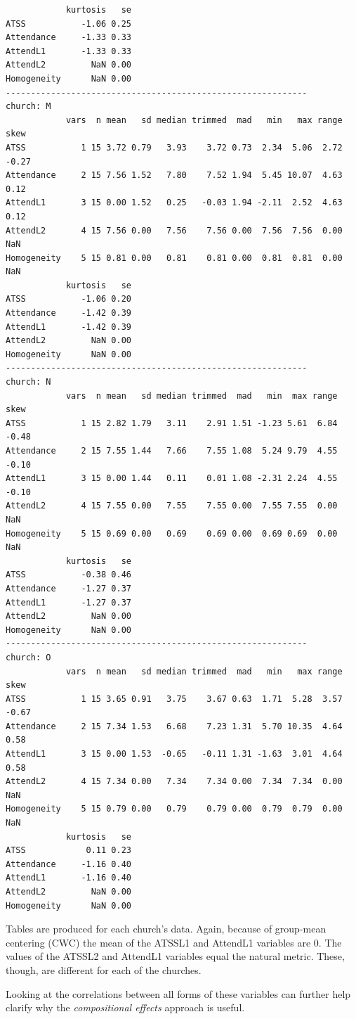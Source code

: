 \documentclass[
  english,
]{book}
\begin{document}
\begin{verbatim}
            kurtosis   se
ATSS           -1.06 0.25
Attendance     -1.33 0.33
AttendL1       -1.33 0.33
AttendL2         NaN 0.00
Homogeneity      NaN 0.00
------------------------------------------------------------ 
church: M
            vars  n mean   sd median trimmed  mad   min   max range  skew
ATSS           1 15 3.72 0.79   3.93    3.72 0.73  2.34  5.06  2.72 -0.27
Attendance     2 15 7.56 1.52   7.80    7.52 1.94  5.45 10.07  4.63  0.12
AttendL1       3 15 0.00 1.52   0.25   -0.03 1.94 -2.11  2.52  4.63  0.12
AttendL2       4 15 7.56 0.00   7.56    7.56 0.00  7.56  7.56  0.00   NaN
Homogeneity    5 15 0.81 0.00   0.81    0.81 0.00  0.81  0.81  0.00   NaN
            kurtosis   se
ATSS           -1.06 0.20
Attendance     -1.42 0.39
AttendL1       -1.42 0.39
AttendL2         NaN 0.00
Homogeneity      NaN 0.00
------------------------------------------------------------ 
church: N
            vars  n mean   sd median trimmed  mad   min  max range  skew
ATSS           1 15 2.82 1.79   3.11    2.91 1.51 -1.23 5.61  6.84 -0.48
Attendance     2 15 7.55 1.44   7.66    7.55 1.08  5.24 9.79  4.55 -0.10
AttendL1       3 15 0.00 1.44   0.11    0.01 1.08 -2.31 2.24  4.55 -0.10
AttendL2       4 15 7.55 0.00   7.55    7.55 0.00  7.55 7.55  0.00   NaN
Homogeneity    5 15 0.69 0.00   0.69    0.69 0.00  0.69 0.69  0.00   NaN
            kurtosis   se
ATSS           -0.38 0.46
Attendance     -1.27 0.37
AttendL1       -1.27 0.37
AttendL2         NaN 0.00
Homogeneity      NaN 0.00
------------------------------------------------------------ 
church: O
            vars  n mean   sd median trimmed  mad   min   max range  skew
ATSS           1 15 3.65 0.91   3.75    3.67 0.63  1.71  5.28  3.57 -0.67
Attendance     2 15 7.34 1.53   6.68    7.23 1.31  5.70 10.35  4.64  0.58
AttendL1       3 15 0.00 1.53  -0.65   -0.11 1.31 -1.63  3.01  4.64  0.58
AttendL2       4 15 7.34 0.00   7.34    7.34 0.00  7.34  7.34  0.00   NaN
Homogeneity    5 15 0.79 0.00   0.79    0.79 0.00  0.79  0.79  0.00   NaN
            kurtosis   se
ATSS            0.11 0.23
Attendance     -1.16 0.40
AttendL1       -1.16 0.40
AttendL2         NaN 0.00
Homogeneity      NaN 0.00
\end{verbatim}

Tables are produced for each church's data. Again, because of group-mean centering (CWC) the mean of the ATSSL1 and AttendL1 variables are 0. The values of the ATSSL2 and AttendL1 variables equal the natural metric. These, though, are different for each of the churches.

Looking at the correlations between all forms of these variables can further help clarify why the \emph{compositional effects} approach is useful.
\end{document}

